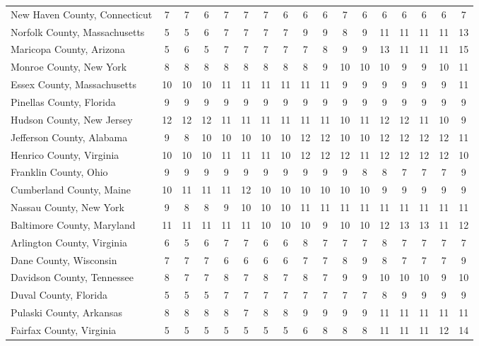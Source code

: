\begin{landscape}
\begin{longtable}{lcccccccccccccccc}
	New Haven County, Connecticut & 7 & 7 & 6 & 7 & 7 & 7 & 6 & 6 & 6 & 7 & 6 & 6 & 6 & 6 & 6 & 7 \\
	Norfolk County, Massachusetts & 5 & 5 & 6 & 7 & 7 & 7 & 7 & 9 & 9 & 8 & 9 & 11 & 11 & 11 & 11 & 13 \\
	Maricopa County, Arizona & 5 & 6 & 5 & 7 & 7 & 7 & 7 & 7 & 8 & 9 & 9 & 13 & 11 & 11 & 11 & 15 \\
	Monroe County, New York & 8 & 8 & 8 & 8 & 8 & 8 & 8 & 8 & 9 & 10 & 10 & 10 & 9 & 9 & 10 & 11 \\
	Essex County, Massachusetts & 10 & 10 & 10 & 11 & 11 & 11 & 11 & 11 & 11 & 9 & 9 & 9 & 9 & 9 & 9 & 11 \\
	Pinellas County, Florida & 9 & 9 & 9 & 9 & 9 & 9 & 9 & 9 & 9 & 9 & 9 & 9 & 9 & 9 & 9 & 9 \\
	Hudson County, New Jersey & 12 & 12 & 12 & 11 & 11 & 11 & 11 & 11 & 11 & 10 & 11 & 12 & 12 & 11 & 10 & 9 \\
	Jefferson County, Alabama & 9 & 8 & 10 & 10 & 10 & 10 & 10 & 12 & 12 & 10 & 10 & 12 & 12 & 12 & 12 & 11 \\
	Henrico County, Virginia & 10 & 10 & 10 & 11 & 11 & 11 & 10 & 12 & 12 & 12 & 11 & 12 & 12 & 12 & 12 & 10 \\
	Franklin County, Ohio & 9 & 9 & 9 & 9 & 9 & 9 & 9 & 9 & 9 & 9 & 8 & 8 & 7 & 7 & 7 & 9 \\
	Cumberland County, Maine & 10 & 11 & 11 & 11 & 12 & 10 & 10 & 10 & 10 & 10 & 10 & 9 & 9 & 9 & 9 & 9 \\
	Nassau County, New York & 9 & 8 & 8 & 9 & 10 & 10 & 10 & 11 & 11 & 11 & 11 & 11 & 11 & 11 & 11 & 11 \\
	Baltimore County, Maryland & 11 & 11 & 11 & 11 & 11 & 10 & 10 & 10 & 9 & 10 & 10 & 12 & 13 & 13 & 11 & 12 \\
	Arlington County, Virginia & 6 & 5 & 6 & 7 & 7 & 6 & 6 & 8 & 7 & 7 & 7 & 8 & 7 & 7 & 7 & 7 \\
	Dane County, Wisconsin & 7 & 7 & 7 & 6 & 6 & 6 & 6 & 7 & 7 & 8 & 9 & 8 & 7 & 7 & 7 & 9 \\
	Davidson County, Tennessee & 8 & 7 & 7 & 8 & 7 & 8 & 7 & 8 & 7 & 9 & 9 & 10 & 10 & 10 & 9 & 10 \\
	Duval County, Florida & 5 & 5 & 5 & 7 & 7 & 7 & 7 & 7 & 7 & 7 & 7 & 8 & 9 & 9 & 9 & 9 \\
	Pulaski County, Arkansas & 8 & 8 & 8 & 8 & 7 & 8 & 8 & 9 & 9 & 9 & 9 & 11 & 11 & 11 & 11 & 11 \\
	Fairfax County, Virginia & 5 & 5 & 5 & 5 & 5 & 5 & 5 & 6 & 8 & 8 & 8 & 11 & 11 & 11 & 12 & 14 \\

\end{longtable}
\end{landscape}

